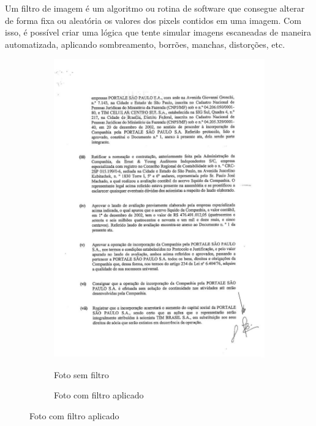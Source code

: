 Um filtro de imagem é um algoritmo ou rotina de software que consegue alterar de forma fixa ou aleatória os valores dos pixels contidos em uma imagem. Com isso, é possível criar uma lógica que tente simular imagens escaneadas de maneira automatizada, aplicando sombreamento, borrões, manchas, distorções, etc.


\begin{figure}[H]
  \centering
  \caption{Diferença entre uma foto original e uma com filtro}
  \begin{subfigure}{.5\textwidth}
    \centering
    \caption{Foto sem filtro}
    \includegraphics[width=0.8\linewidth]{figuras/good-text-image.jpg}
    \label{fig:image-without-filter}
  \end{subfigure}%
  \begin{subfigure}{.5\textwidth}
    \centering
    \caption{Foto com filtro aplicado}

\end{subfigure}
\end{figure}
